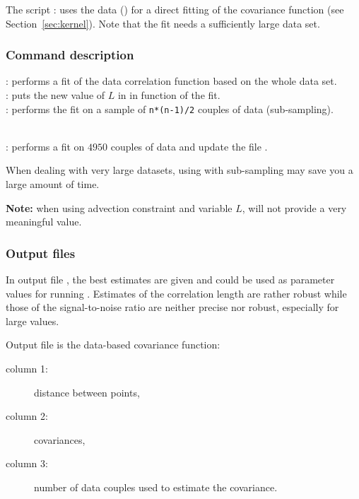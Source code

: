 The script : uses the data () for a direct fitting of the covariance function (see Section~\ref{sec:kernel}). Note that the fit needs a sufficiently large data set.

\subsubsection{Command description}

 \qquad: performs a fit of the data correlation function based on the whole data set. \\
 \qquad: puts the new value of $L$ in  in function of the fit.\\
 \qquad: performs the fit on a sample of \texttt{n*(n-1)/2} couples of data (sub-sampling). 

\example\\
: performs a fit on $4950$ couples of data and update the file .

\btips
When dealing with very large datasets, using  with sub-sampling may save you a large amount of time.
\etips

\textbf{Note:} when using advection  constraint and variable $L$,  will not provide a very meaningful value.

\subsubsection{Output files}

In output file , the best estimates are given and could be used as parameter values for running \diva.
Estimates of the correlation length are rather robust while those of the signal-to-noise ratio are neither precise nor robust, especially for large values.

Output file  is the data-based covariance function:
\begin{description}
\item[column 1:] distance between points,
\item[column 2:] covariances, 
\item[column 3:] number of data couples used to estimate the covariance. 
\end{description} 

